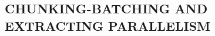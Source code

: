 \documentclass[a4paper,twoside]{article}
\begin{document}
%
%
%
%


\subsection{\uppercase{Chunking-Batching and Extracting Parallelism}} 
\label{subsec:batching}
\end{document}
